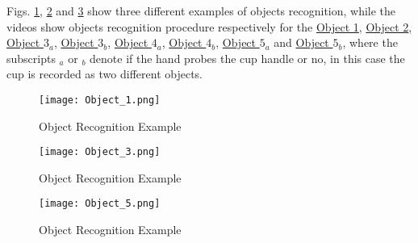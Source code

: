 Figs. \ref{fig:Object_1}, \ref{fig:Object_3} and \ref{fig:Object_5} show three different examples of objects recognition, while the videos show objects recognition procedure respectively for the \href{https://www.youtube.com/watch?v=d_WPQ3WmHRg}{Object 1}, \href{https://www.youtube.com/watch?v=PG38VObdl6o}{Object 2}, \href{https://www.youtube.com/watch?v=bIYhLXm90hc}{Object $3_a$}, \href{https://www.youtube.com/watch?v=IXVlBAoGKho}{Object $3_b$}, \href{https://www.youtube.com/watch?v=Efmm6-JHcxU}{Object $4_a$}, \href{https://www.youtube.com/watch?v=NZElSV_AnJ4}{Object $4_b$}, \href{https://www.youtube.com/watch?v=mDDb5oTaHzM}{Object $5_a$} and \href{https://www.youtube.com/watch?v=sLzU39zffFY}{Object $5_b$}, where the subscripts $_a$ or $_b$ denote if the hand probes the cup handle or no, in this case the cup is recorded as two different objects.

\begin{figure}[h]
\centering
\texttt{[image: Object\_1.png]}
\caption{Object Recognition Example}
\label{fig:Object_1}
\end{figure}

\begin{figure}[h]
\centering
\texttt{[image: Object\_3.png]}
\caption{Object Recognition Example}
\label{fig:Object_3}
\end{figure}

\begin{figure}[h]
\centering
\texttt{[image: Object\_5.png]}
\caption{Object Recognition Example}
\label{fig:Object_5}
\end{figure}
